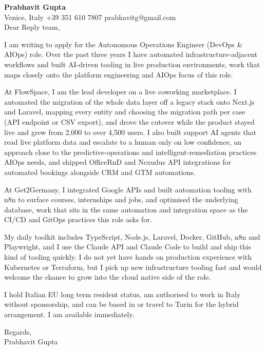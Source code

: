 \documentclass[a4paper,10.5pt]{article}
\begin{document}
\textbf{Prabhavit Gupta}\\
Venice, Italy \textbar{} +39 351 610 7807 \textbar{} prabhavitg@gmail.com\\[10pt]
Dear Reply team,

I am writing to apply for the Autonomous Operations Engineer (DevOps \& AIOps) role. Over the past three years I have automated infrastructure-adjacent workflows and built AI-driven tooling in live production environments, work that maps closely onto the platform engineering and AIOps focus of this role.

At FlowSpace, I am the lead developer on a live coworking marketplace. I automated the migration of the whole data layer off a legacy stack onto Next.js and Laravel, mapping every entity and choosing the migration path per case (API endpoint or CSV export), and drove the cutover while the product stayed live and grew from 2,000 to over 4,500 users. I also built support AI agents that read live platform data and escalate to a human only on low confidence, an approach close to the predictive-operations and intelligent-remediation practices AIOps needs, and shipped OfficeRnD and Nexudus API integrations for automated bookings alongside CRM and GTM automations.

At Get2Germany, I integrated Google APIs and built automation tooling with n8n to surface courses, internships and jobs, and optimised the underlying database, work that sits in the same automation and integration space as the CI/CD and GitOps practices this role asks for.

My daily toolkit includes TypeScript, Node.js, Laravel, Docker, GitHub, n8n and Playwright, and I use the Claude API and Claude Code to build and ship this kind of tooling quickly. I do not yet have hands on production experience with Kubernetes or Terraform, but I pick up new infrastructure tooling fast and would welcome the chance to grow into the cloud native side of the role.

I hold Italian EU long term resident status, am authorised to work in Italy without sponsorship, and can be based in or travel to Turin for the hybrid arrangement. I am available immediately.

Regards,\\
Prabhavit Gupta
\end{document}
